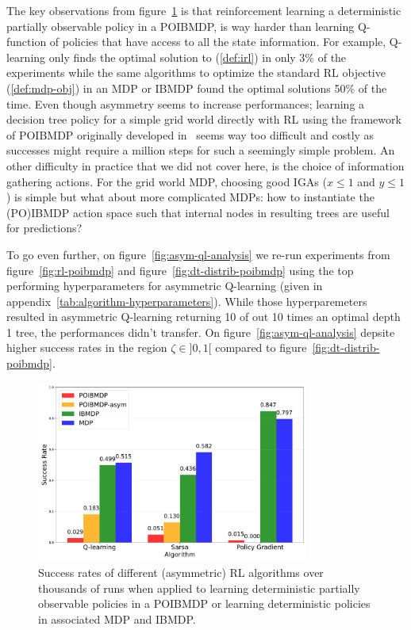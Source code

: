 The key observations from figure~\ref{fig:po-vs-ib} is that reinforcement learning a deterministic partially observable policy in a POIBMDP, is way harder than learning Q-function of policies that have access to all the state information.
For example, Q-learning only finds the optimal solution to (\ref{def:irl}) in only 3\% of the experiments while the same algorithms to optimize the standard RL objective (\ref{def:mdp-obj}) in an MDP or IBMDP found the optimal solutions 50\% of the time.
Even though asymmetry seems to increase performances; learning a decision tree policy for a simple grid world directly with RL using the framework of POIBMDP originally developed in~\cite{topin2021iterative} seems way too difficult and costly as successes might require a million steps for such a seemingly simple problem.
An other difficulty in practice that we did not cover here, is the choice of information gathering actions.
For the grid world MDP, choosing good IGAs ($x\leq1$ and $y\leq1$) is simple but what about more complicated MDPs: how to instantiate the (PO)IBMDP action space such that internal nodes in resulting trees are useful for predictions?

To go even further, on figure~\ref{fig:asym-ql-analysis} we re-run experiments from figure~\ref{fig:rl-poibmdp} and figure~\ref{fig:dt-distrib-poibmdp} using the top performing hyperparameters for asymmetric Q-learning (given in appendix~\ref{tab:algorithm-hyperparameters}).
While those hyperparemeters resulted in asymmetric Q-learning returning 10 of out 10 times an optimal depth 1 tree,
the performances didn't transfer.
On figure~\ref{fig:asym-ql-analysis} depsite higher success rates in the region $\zeta\in]0,1[$ compared to figure~\ref{fig:dt-distrib-poibmdp}. 

\begin{figure}
    \centering
    \includegraphics[width=0.8\textwidth]{images/images_part1/algorithm_performance_comparison_flattened.pdf}
    \caption{Success rates of different (asymmetric) RL algorithms over thousands of runs when applied to learning deterministic partially observable policies in a POIBMDP or learning deterministic policies in associated MDP and IBMDP.}\label{fig:po-vs-ib}
\end{figure}


